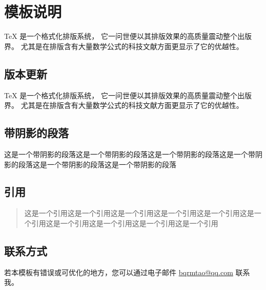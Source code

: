 % 
% 
% 
% 
% 
% 

\chapter{模板说明}
\label{chapter:templateinfo}

\TeX{} \index{\TeX} 是一个格式化排版系统，
它一问世便以其排版效果的高质量震动整个出版界。
尤其是在排版含有大量数学公式的科技文献方面更显示了它的优越性。

\section{版本更新}

\TeX{} \index{\TeX} 是一个格式化排版系统，
它一问世便以其排版效果的高质量震动整个出版界。
尤其是在排版含有大量数学公式的科技文献方面更显示了它的优越性。

\section{带阴影的段落}
\begin{shaded}
这是一个带阴影的段落这是一个带阴影的段落这是一个带阴影的段落这是一个带阴影的段落这是一个带阴影的段落这是一个带阴影的段落
\end{shaded}

\section{引用}\label{sec:quotation}
\begin{quote}\label{quotation:quote}
这是一个引用这是一个引用这是一个引用这是一个引用这是一个引用这是一个引用这是一个引用这是一个引用这是一个引用这是一个引用
\end{quote}

\section{联系方式}
若本模板有错误或可优化的地方，您可以通过电子邮件 \href{mailto:bqrmtao@qq.com}{bqrmtao@qq.com} 联系我。
